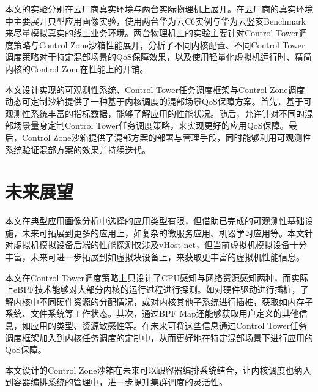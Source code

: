 本文的实验分别在云厂商真实环境与两台实际物理机上展开。在云厂商的真实环境中主要展开典型应用画像实验，使用两台华为云C6实例与华为云竖亥Benchmark来尽量模拟真实的线上业务环境。两台物理机上的实验主要针对Control Tower调度策略与Control Zone沙箱性能展开，分析了不同内核配置、不同Control Tower调度策略对于特定混部场景的QoS保障效果，以及使用轻量化虚拟机运行时、精简内核的Control Zone在性能上的开销。

本文设计实现的可观测性系统、Control Tower任务调度框架与Control Zone调度动态可定制沙箱提供了一种基于内核调度的混部场景QoS保障方案。首先，基于可观测性系统丰富的指标数据，能够了解应用的性能状况。随后，允许针对不同的混部场景量身定制Control Tower任务调度策略，来实现更好的应用QoS保障。最后，Control Zone沙箱提供了混部方案的部署与管理手段，同时能够利用可观测性系统验证混部方案的效果并持续迭代。

\section{未来展望}

本文在典型应用画像分析中选择的应用类型有限，但借助已完成的可观测性基础设施，未来可拓展到更多的应用上，如复杂的微服务应用、机器学习应用等。本文针对虚拟机模拟设备后端的性能探测仅涉及vHost net，但当前虚拟机模拟设备十分丰富，未来可进一步拓展到如虚拟块设备上，来获取更丰富的虚拟机性能信息。

本文在Control Tower调度策略上只设计了CPU感知与网络资源感知两种，而实际上eBPF技术能够对大部分内核的运行过程进行探测。如对硬件驱动进行插桩，了解内核中不同硬件资源的分配情况，或对内核其他子系统进行插桩，获取如内存子系统、文件系统等工作状态。其次，通过BPF Map还能够获取用户定义的其他信息，如应用的类型、资源敏感性等。在未来可将这些信息通过Control Tower任务调度框架加入到内核任务调度的定制中，从而更好地在特定混部场景下进行应用的QoS保障。

本文设计的Control Zone沙箱在未来可以跟容器编排系统结合，让内核调度也纳入到容器编排系统的管理中，进一步提升集群调度的灵活性。